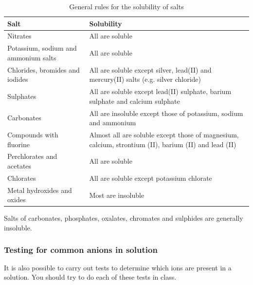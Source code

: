          \begin{table}[H]
        \begin{center}
      \label{m38719*uid69}
    \noindent
      \begin{tabular}{|l|l|}\hline
                \textbf{Salt}
               &
                \textbf{Solubility} \\ \hline
        Nitrates &
        All are soluble \\ \hline
        Potassium, sodium and ammonium salts &
        All are soluble \\ \hline
        Chlorides, bromides and iodides &
        All are soluble except silver, lead(II) and mercury(II) salts (e.g. silver chloride) \\ \hline
        Sulphates &
        All are soluble except lead(II) sulphate, barium sulphate and calcium sulphate \\ \hline
        Carbonates &
        All are insoluble except those of potassium, sodium and ammonium \\ \hline
        Compounds with fluorine &
        Almost all are soluble except those of magnesium, calcium, strontium (II), barium (II) and lead (II) \\ \hline
        Perchlorates and acetates &
        All are soluble \\ \hline
        Chlorates &
        All are soluble except potassium chlorate \\ \hline
        Metal hydroxides and oxides &
        Most are insoluble \\ \hline
    \end{tabular}
      \end{center}
    \caption{General rules for the solubility of salts}
\end{table}
    \par
  \label{m38719*eip-870}Salts of carbonates, phosphates, oxalates, chromates and sulphides are generally insoluble.\par 
    \label{m38719*cid9}
            \subsubsection{ Testing for common anions in solution}
            \nopagebreak
      \label{m38719*id341125}It is also possible to carry out tests to determine which ions are present in a solution. You should try to do each of these tests in class.\par 
      \label{m38719*eip-795}
	\par
      \label{m38719*uid70}
